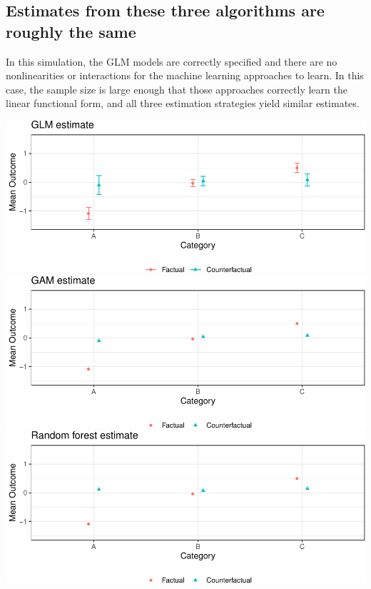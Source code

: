 \documentclass[
]{article}
\begin{document}
\subsection{Estimates from these three algorithms are roughly the same}\label{estimates-from-these-three-algorithms-are-roughly-the-same}

In this simulation, the GLM models are correctly specified and there are no nonlinearities or interactions for the machine learning approaches to learn. In this case, the sample size is large enough that those approaches correctly learn the linear functional form, and all three estimation strategies yield similar estimates.

\includegraphics{github_doc_files/figure-latex/unnamed-chunk-23-1.pdf} \includegraphics{github_doc_files/figure-latex/unnamed-chunk-23-2.pdf} \includegraphics{github_doc_files/figure-latex/unnamed-chunk-23-3.pdf}
\end{document}
